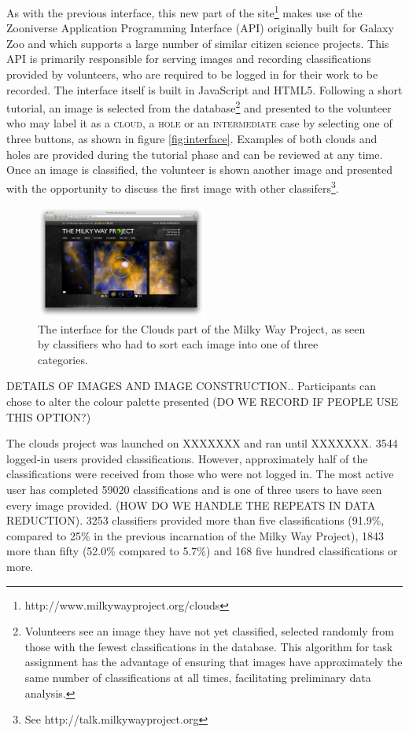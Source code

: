 \documentclass[a4,useAMS,usenatbib]{mn2e}
\begin{document}
As with the previous interface, this new part of the site\footnote{http://www.milkywayproject.org/clouds} makes use of the Zooniverse Application Programming Interface (API) originally built for Galaxy Zoo \citep{Lintottetal} and which supports a large number of similar citizen science projects. This API is primarily responsible for serving images and recording classifications provided by volunteers, who are required to be logged in for their work to be recorded. The interface itself is built in JavaScript and HTML5. Following a short tutorial, an image is selected from the database\footnote{Volunteers see an image they have not yet classified, selected randomly from those with the fewest classifications in the database. This algorithm for task assignment has the advantage of ensuring that images have approximately the same number of classifications at all times, facilitating preliminary data analysis.} and presented to the volunteer who may label it as a \textsc{cloud}, a \textsc{hole} or an \textsc{intermediate} case by selecting one of three buttons, as shown in figure \ref{fig:interface}. Examples of both clouds and holes are provided during the tutorial phase and can be reviewed at any time. Once an image is classified, the volunteer is shown another image and presented with the opportunity to discuss the first image with other classifers\footnote{See http://talk.milkywayproject.org}. 

\begin{figure}
\includegraphics[angle=0,width=0.5\textwidth]{Interface.png}
\caption{The interface for the Clouds part of the Milky Way Project, as seen by classifiers who had to sort each image into one of three categories.}
\end{figure}

DETAILS OF IMAGES AND IMAGE CONSTRUCTION.. Participants can chose to alter the colour palette presented (DO WE RECORD IF PEOPLE USE THIS OPTION?)

The clouds project was launched on XXXXXXX and ran until XXXXXXX. 3544 logged-in users provided classifications. However, approximately half of the classifications were received from those who were not logged in. The most active user has completed 59020 classifications and is one of three users to have seen every image provided. (HOW DO WE HANDLE THE REPEATS IN DATA REDUCTION). 3253 classifiers provided more than five classifications (91.9\%, compared to 25\% in the previous incarnation of the Milky Way Project), 1843 more than fifty (52.0\% compared to 5.7\%) and 168 five hundred classifications or more. 
\end{document}
